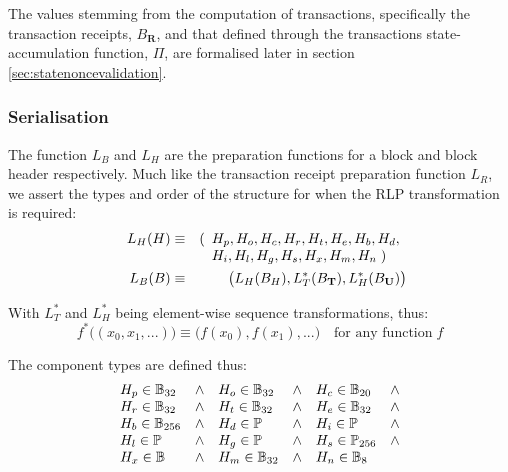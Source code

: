 \documentclass[9pt,oneside]{amsart}
\begin{document}
\begin{multicols}{2}
The values stemming from the computation of transactions, specifically the transaction receipts, $B_\mathbf{R}$, and that defined through the transactions state-accumulation function, $\Pi$, are formalised later in section \ref{sec:statenoncevalidation}.

\subsubsection{Serialisation}

The function $L_B$ and $L_H$ are the preparation functions for a block and block header respectively. Much like the transaction receipt preparation function $L_R$, we assert the types and order of the structure for when the RLP transformation is required:
\begin{eqnarray}
\quad L_H(H) & \equiv & (\begin{array}[t]{l}H_p, H_o, H_c, H_r, H_t, H_e, H_b, H_d,\\ H_i, H_l, H_g, H_s, H_x, H_m, H_n \; )\end{array} \\
\quad L_B(B) & \equiv & \big( L_H(B_H), L_T^*(B_\mathbf{T}), L_H^*(B_\mathbf{U}) \big)
\end{eqnarray}

With $L_T^*$ and $L_H^*$ being element-wise sequence transformations, thus:
\begin{equation}
f^*\big( (x_0, x_1, ...) \big) \equiv \big( f(x_0), f(x_1), ... \big) \quad \text{for any function} \; f
\end{equation}

The component types are defined thus:
\begin{equation}
\begin{array}[t]{lclclcl}
H_p \in \mathbb{B}_{32} & \wedge & H_o \in \mathbb{B}_{32} & \wedge & H_c \in \mathbb{B}_{20} & \wedge \\
H_r \in \mathbb{B}_{32} & \wedge & H_t \in \mathbb{B}_{32} & \wedge & H_e \in \mathbb{B}_{32} & \wedge \\
H_b \in \mathbb{B}_{256} & \wedge & H_d \in \mathbb{P} & \wedge & H_i \in \mathbb{P} & \wedge \\
H_l \in \mathbb{P} & \wedge & H_g \in \mathbb{P} & \wedge & H_s \in \mathbb{P}_{256} & \wedge \\
H_x \in \mathbb{B} & \wedge & H_m \in \mathbb{B}_{32} & \wedge & H_n \in \mathbb{B}_{8}
\end{array}
\end{equation}


\end{multicols}
\end{document}

